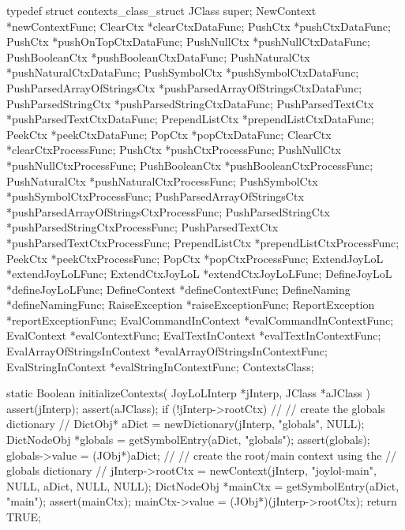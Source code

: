 \startCHeader
typedef struct contexts_class_struct {
  JClass           super;
  NewContext      *newContextFunc;
  ClearCtx        *clearCtxDataFunc;
  PushCtx         *pushCtxDataFunc; 
  PushCtx         *pushOnTopCtxDataFunc; 
  PushNullCtx     *pushNullCtxDataFunc;
  PushBooleanCtx  *pushBooleanCtxDataFunc;
  PushNaturalCtx  *pushNaturalCtxDataFunc;
  PushSymbolCtx   *pushSymbolCtxDataFunc;
  PushParsedArrayOfStringsCtx 
    *pushParsedArrayOfStringsCtxDataFunc;
  PushParsedStringCtx
    *pushParsedStringCtxDataFunc;
  PushParsedTextCtx
    *pushParsedTextCtxDataFunc;
  PrependListCtx  *prependListCtxDataFunc;
  PeekCtx         *peekCtxDataFunc;
  PopCtx          *popCtxDataFunc;
  ClearCtx        *clearCtxProcessFunc;
  PushCtx         *pushCtxProcessFunc;
  PushNullCtx     *pushNullCtxProcessFunc;
  PushBooleanCtx  *pushBooleanCtxProcessFunc;
  PushNaturalCtx  *pushNaturalCtxProcessFunc;
  PushSymbolCtx   *pushSymbolCtxProcessFunc;
  PushParsedArrayOfStringsCtx
    *pushParsedArrayOfStringsCtxProcessFunc;
  PushParsedStringCtx
    *pushParsedStringCtxProcessFunc;
  PushParsedTextCtx
    *pushParsedTextCtxProcessFunc;
  PrependListCtx  *prependListCtxProcessFunc;
  PeekCtx         *peekCtxProcessFunc;
  PopCtx          *popCtxProcessFunc;
  ExtendJoyLoL    *extendJoyLoLFunc;
  ExtendCtxJoyLoL *extendCtxJoyLoLFunc;
  DefineJoyLoL    *defineJoyLoLFunc;
  DefineContext   *defineContextFunc;
  DefineNaming    *defineNamingFunc;
  RaiseException  *raiseExceptionFunc;
  ReportException
    *reportExceptionFunc;
  EvalCommandInContext
    *evalCommandInContextFunc;
  EvalContext     *evalContextFunc;
  EvalTextInContext
    *evalTextInContextFunc;
  EvalArrayOfStringsInContext
    *evalArrayOfStringsInContextFunc;
  EvalStringInContext
    *evalStringInContextFunc;
} ContextsClass;
\stopCHeader

\startCCode
static Boolean initializeContexts(
  JoyLoLInterp *jInterp,
  JClass   *aJClass
) {
  assert(jInterp);
  assert(aJClass);
  if (!jInterp->rootCtx) {
    //
    // create the globals dictionary
    //
    DictObj* aDict = newDictionary(jInterp, "globals", NULL);
    DictNodeObj *globals = getSymbolEntry(aDict, "globals");
    assert(globals);
    globals->value = (JObj*)aDict;
    //
    // create the root/main context using the 
    // globals dictionary
    //
    jInterp->rootCtx =
      newContext(jInterp, "joylol-main", NULL, aDict, NULL, NULL);
    DictNodeObj *mainCtx = getSymbolEntry(aDict, "main");
    assert(mainCtx);
    mainCtx->value = (JObj*)(jInterp->rootCtx);
  }
  return TRUE;
}
\stopCCode


